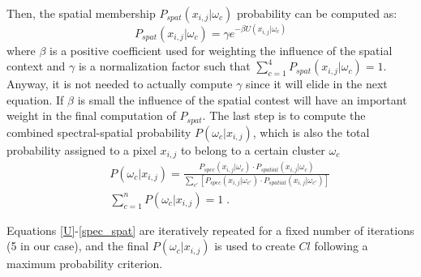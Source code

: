 \documentclass[letterpaper, 10pt, conference]{ieeeconf}      %
\begin{document}
Then, the spatial membership $P_{spat}(x_{i,j}|\omega_c)$ probability can be computed as:
%
\begin{equation} \label{spatial}
P_{spat}(x_{i,j}|\omega_c) = \gamma e^{-\beta U(x_{i,j}|\omega_c)}
\end{equation}
%
where $\beta$ is a positive coefficient used for weighting  the influence of the spatial context and $\gamma$ is a normalization factor such that $\sum_{c=1}^4 P_{spat}(x_{i,j}|\omega_c)=1$.
Anyway, it is not needed to actually compute $\gamma$ since it will elide in the next equation.
%
If $\beta$ is small the influence of the spatial contest will have an important weight in the final computation of $P_{spat}$.
%
The last step is to compute the combined spectral-spatial probability $P(\omega_c|x_{i,j})$, which is also the total probability  assigned to a pixel $x_{i,j}$ to belong to a certain cluster $\omega_c$ 
%
\begin{eqnarray}  \label{spec_spat}
&&P(\omega_c|x_{i,j}) = \frac{P_{spec}(x_{i,j}|\omega_c) \cdot P_{spatial}(x_{i,j}|\omega_c) }{\sum_{c'}[P_{spec}(x_{i,j}|\omega_{c'}) \cdot P_{spatial}(x_{i,j}|\omega_{c'})]}  \nonumber\\
 &&\sum_{c=1}^n P(\omega_c|x_{i,j})=1 \;.
\end{eqnarray}

Equations  \eqref{U}-\eqref{spec_spat} are iteratively repeated for a fixed number of iterations (5 in our case), and the final $P(\omega_c|x_{i,j})$ is used to create $Cl$ following a maximum probability criterion.




\end{document}

